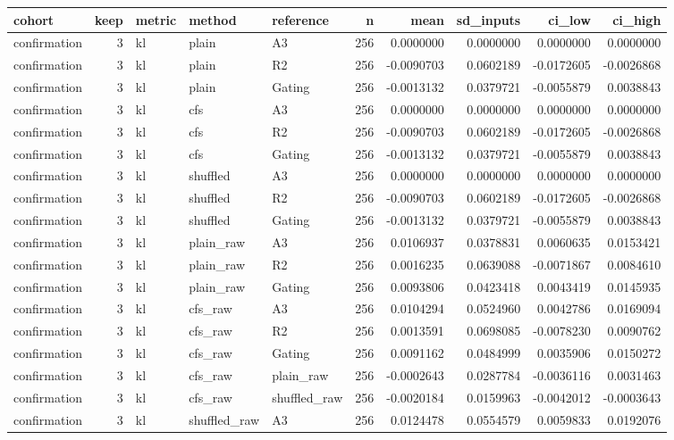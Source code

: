 \begin{tabular}{lrlllrrrrr}
\toprule
cohort & keep & metric & method & reference & n & mean & sd_inputs & ci_low & ci_high \\
\midrule
confirmation & 3 & kl & plain & A3 & 256 & 0.0000000 & 0.0000000 & 0.0000000 & 0.0000000 \\
confirmation & 3 & kl & plain & R2 & 256 & -0.0090703 & 0.0602189 & -0.0172605 & -0.0026868 \\
confirmation & 3 & kl & plain & Gating & 256 & -0.0013132 & 0.0379721 & -0.0055879 & 0.0038843 \\
confirmation & 3 & kl & cfs & A3 & 256 & 0.0000000 & 0.0000000 & 0.0000000 & 0.0000000 \\
confirmation & 3 & kl & cfs & R2 & 256 & -0.0090703 & 0.0602189 & -0.0172605 & -0.0026868 \\
confirmation & 3 & kl & cfs & Gating & 256 & -0.0013132 & 0.0379721 & -0.0055879 & 0.0038843 \\
confirmation & 3 & kl & shuffled & A3 & 256 & 0.0000000 & 0.0000000 & 0.0000000 & 0.0000000 \\
confirmation & 3 & kl & shuffled & R2 & 256 & -0.0090703 & 0.0602189 & -0.0172605 & -0.0026868 \\
confirmation & 3 & kl & shuffled & Gating & 256 & -0.0013132 & 0.0379721 & -0.0055879 & 0.0038843 \\
confirmation & 3 & kl & plain_raw & A3 & 256 & 0.0106937 & 0.0378831 & 0.0060635 & 0.0153421 \\
confirmation & 3 & kl & plain_raw & R2 & 256 & 0.0016235 & 0.0639088 & -0.0071867 & 0.0084610 \\
confirmation & 3 & kl & plain_raw & Gating & 256 & 0.0093806 & 0.0423418 & 0.0043419 & 0.0145935 \\
confirmation & 3 & kl & cfs_raw & A3 & 256 & 0.0104294 & 0.0524960 & 0.0042786 & 0.0169094 \\
confirmation & 3 & kl & cfs_raw & R2 & 256 & 0.0013591 & 0.0698085 & -0.0078230 & 0.0090762 \\
confirmation & 3 & kl & cfs_raw & Gating & 256 & 0.0091162 & 0.0484999 & 0.0035906 & 0.0150272 \\
confirmation & 3 & kl & cfs_raw & plain_raw & 256 & -0.0002643 & 0.0287784 & -0.0036116 & 0.0031463 \\
confirmation & 3 & kl & cfs_raw & shuffled_raw & 256 & -0.0020184 & 0.0159963 & -0.0042012 & -0.0003643 \\
confirmation & 3 & kl & shuffled_raw & A3 & 256 & 0.0124478 & 0.0554579 & 0.0059833 & 0.0192076 \\

\end{tabular}
